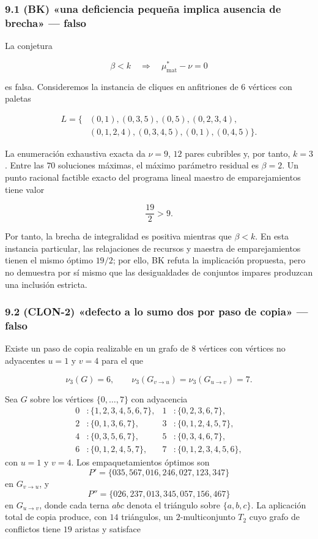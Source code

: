 \documentclass[spanish,11pt,a4paper]{article}
\begin{document}
\subsubsection{9.1 (BK) «una deficiencia pequeña implica ausencia de
brecha» ---
falso}\label{bk-una-deficiencia-pequeuxf1a-implica-ausencia-de-brecha-falso}

La conjetura

\[
\beta<k
\quad\Longrightarrow\quad
\mu^*_{\mathrm{mat}}-\nu=0
\]

es falsa. Consideremos la instancia de cliques en anfitriones de 6
vértices con paletas

\[
\begin{aligned}
L=\{&(0,1),(0,3,5),(0,5),(0,2,3,4),\\
    &(0,1,2,4),(0,3,4,5),(0,1),(0,4,5)\}.
\end{aligned}
\]

La enumeración exhaustiva exacta da \(\nu=9\), \(12\) pares cubribles y,
por tanto, \(k=3\). Entre las \(70\) soluciones máximas, el máximo
parámetro residual es \(\beta=2\). Un punto racional factible exacto del
programa lineal maestro de emparejamientos tiene valor

\[
\frac{19}{2}>9.
\]

Por tanto, la brecha de integralidad es positiva mientras que
\(\beta<k\). En esta instancia particular, las relajaciones de recursos
y maestra de emparejamientos tienen el mismo óptimo \(19/2\); por ello,
BK refuta la implicación propuesta, pero no demuestra por sí mismo que
las desigualdades de conjuntos impares produzcan una inclusión estricta.

\subsubsection{9.2 (CLON-2) «defecto a lo sumo dos por paso de copia»
--- falso}\label{clon-2-defecto-a-lo-sumo-dos-por-paso-de-copia-falso}

Existe un paso de copia realizable en un grafo de \(8\) vértices con
vértices no adyacentes \(u=1\) y \(v=4\) para el que

\[
\nu_3(G)=6,
\qquad
\nu_3(G_{v\to u})=\nu_3(G_{u\to v})=7.
\]

Sea \(G\) sobre los vértices \(\{0,\dots,7\}\) con adyacencia \[
\begin{aligned}
0&:\{1,2,3,4,5,6,7\}, & 1&:\{0,2,3,6,7\},\\
2&:\{0,1,3,6,7\}, & 3&:\{0,1,2,4,5,7\},\\
4&:\{0,3,5,6,7\}, & 5&:\{0,3,4,6,7\},\\
6&:\{0,1,2,4,5,7\}, & 7&:\{0,1,2,3,4,5,6\},
\end{aligned}
\] con \(u=1\) y \(v=4\). Los empaquetamientos óptimos son \[
P'=\{035,567,016,246,027,123,347\}
\] en \(G_{v\to u}\), y \[
P''=\{026,237,013,345,057,156,467\}
\] en \(G_{u\to v}\), donde cada terna \(abc\) denota el triángulo sobre
\(\{a,b,c\}\). La aplicación total de copia produce, con \(14\)
triángulos, un \(2\)-multiconjunto \(T_2\) cuyo grafo de conflictos
tiene \(19\) aristas y satisface
\end{document}
